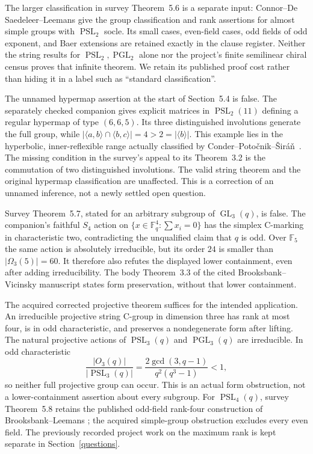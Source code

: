 \documentclass[11pt]{article}
\newcommand{\gen}[1]{\langle#1\rangle}
\newcommand{\PSL}{\operatorname{PSL}}\newcommand{\PGL}{\operatorname{PGL}}
\newcommand{\note}[1]{\marginpar{\raggedright\scriptsize #1}}
\begin{document}
The larger classification in survey Theorem~5.6 is a separate input:
Connor--De Saedeleer--Leemans \cite{almost2} give the group
classification and rank assertions for almost simple groups with $\PSL_2$ socle.
Its small cases, even-field cases, odd fields of odd exponent, and
Baer extensions are retained exactly in the clause register. Neither
the string results for $\PSL_2,\PGL_2$ alone nor the project's finite
semilinear chiral census proves that infinite theorem. We retain its
published proof cost rather than hiding it in a label such as
``standard classification''.

\note{Correction}
The unnamed hypermap assertion at the start of Section~5.4 is false.
The separately checked companion gives explicit matrices in
$\operatorname{PSL}_2(11)$ defining a regular hypermap of type $(6,6,5)$.
Its three distinguished involutions generate the full group, while
$|\gen{a,b}\cap\gen{b,c}|=4>2=|\gen b|$.
This example lies in the hyperbolic, inner-reflexible range actually
classified by Conder--Poto\v cnik--\v Sir\'a\v n~\cite{hypermaps}.
The missing condition in the survey's appeal to its Theorem~3.2 is the
commutation of two distinguished involutions. The valid string theorem
and the original hypermap classification are unaffected. This is a
correction of an unnamed inference, not a newly settled open question.

\note{Correction}
Survey Theorem~5.7, stated for an arbitrary subgroup of
$\operatorname{GL}_3(q)$, is false. The companion's faithful $S_4$
action on $\{x\in\mathbb F_q^4:\sum x_i=0\}$ has the simplex
C-marking in characteristic two, contradicting the unqualified claim
that $q$ is odd. Over $\mathbb F_5$ the same action is absolutely
irreducible, but its order $24$ is smaller than
$|\Omega_3(5)|=60$. It therefore also refutes the displayed lower
containment, even after adding irreducibility. The body Theorem~3.3
of the cited Brooksbank--Vicinsky manuscript states form preservation,
without that lower containment.

The acquired corrected projective theorem suffices for the intended
application. An irreducible projective string C-group in dimension
three has rank at most four, is in odd characteristic, and preserves
a nondegenerate form after lifting. The natural projective actions
of $\PSL_3(q)$ and $\PGL_3(q)$ are irreducible. In odd characteristic
\[
       \frac{|O_3(q)|}{|\PSL_3(q)|}
       =\frac{2\gcd(3,q-1)}{q^2(q^3-1)}<1,
\]
so neither full projective group can occur. This is an actual form
obstruction, not a lower-containment assertion about every subgroup.
For $\PSL_4(q)$, survey Theorem~5.8 retains the published odd-field
rank-four construction of Brooksbank--Leemans \cite{linear4}; the
acquired simple-group obstruction excludes every even field.
The previously recorded project work on the maximum rank is kept
separate in Section~\ref{questions}.
\end{document}
